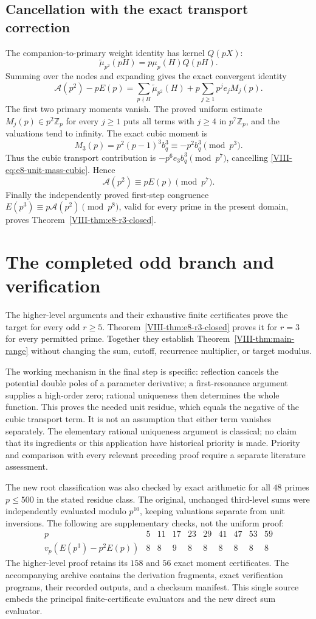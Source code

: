 \documentclass[11pt,letterpaper]{article}
\numberwithin{equation}{section}
\begin{document}
\subsection{Cancellation with the exact transport correction}
The companion-to-primary weight identity has kernel \(Q(pX)\):
\[
 \widetilde\mu_{p^2}(pH)=p\mu_p(H)Q(pH).
\]
Summing over the nodes and expanding gives the exact convergent identity
\[
 \mathcal A(p^2)-pE(p)
 =\sum_{p\nmid H}\widetilde\mu_{p^2}(H)
      +p\sum_{j\ge1}p^je_jM_j(p).
\]
The first two primary moments vanish.  The proved uniform estimate
\(M_j(p)\in p^2\mathbb Z_p\) for every \(j\ge1\) puts all terms
with \(j\ge4\) in \(p^7\mathbb Z_p\), and the valuations tend to
infinity.  The exact cubic moment is
\[
 M_3(p)=p^2(p-1)^3b_q^3\equiv-p^2b_q^3\pmod{p^3}.
\]
Thus the cubic transport contribution is
\(-p^6e_3b_q^3\pmod{p^7}\), cancelling
\eqref{VIII-eq:e8-unit-mass-cubic}.  Hence
\[
 \mathcal A(p^2)\equiv pE(p)\pmod{p^7}.
\]
Finally the independently proved first-step congruence
\(E(p^3)\equiv p\mathcal A(p^2)\pmod{p^8}\), valid for every prime
in the present domain, proves Theorem~\ref{VIII-thm:e8-r3-closed}.


\section{The completed odd branch and verification}\label{loc-VIII-25}
The higher-level arguments and their exhaustive finite certificates
prove the target for every odd $r\ge5$. Theorem~\ref{VIII-thm:e8-r3-closed}
proves it for $r=3$ for every permitted prime. Together they establish
Theorem~\ref{VIII-thm:main-range} without changing the sum, cutoff,
recurrence multiplier, or target modulus.

The working mechanism in the final step is specific: reflection
cancels the potential double poles of a parameter derivative;
a first-resonance argument supplies a high-order zero; rational
uniqueness then determines the whole function. This proves the
needed unit residue, which equals the negative of the cubic transport
term. It is not an assumption that either term vanishes separately.
The elementary rational uniqueness argument is classical; no claim
that its ingredients or this application have historical priority
is made. Priority and comparison with every relevant preceding proof
require a separate literature assessment.

The new root classification was also checked by exact arithmetic
for all $48$ primes $p\le500$ in the stated residue class. The
original, unchanged third-level sums were independently evaluated
modulo $p^{10}$, keeping valuations separate from unit inversions.
The following are supplementary checks, not the uniform proof:
\[
\begin{array}{c|rrrrrrrrr}
p&5&11&17&23&29&41&47&53&59\\\hline
v_p(E(p^3)-p^2E(p))&8&8&9&8&8&8&8&8&8
\end{array}
\]
The higher-level proof retains its $158$ and $56$ exact moment
certificates. The accompanying archive contains the derivation
fragments, exact verification programs, their recorded outputs,
and a checksum manifest. This single source embeds the principal
finite-certificate evaluators and the new direct sum evaluator.
\end{document}

